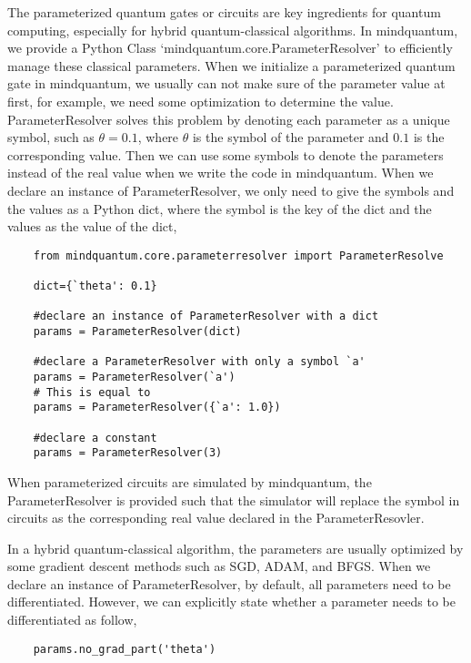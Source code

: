 


The parameterized quantum gates or circuits are key ingredients for quantum computing, especially for hybrid quantum-classical algorithms.
In mindquantum, we provide a Python Class `mindquantum.core.ParameterResolver' to efficiently manage these classical parameters.
When we initialize a parameterized quantum gate in mindquantum, we usually can not make sure of the parameter value at first, for example, we need some optimization to determine the value.
ParameterResolver solves this problem by
denoting each parameter as a unique symbol, such as $\theta=0.1$, where $\theta$ is the symbol of the parameter and $0.1$ is the corresponding value.
Then we can use some symbols to denote the parameters instead of the real value when we write the code in mindquantum. 
When we declare an instance of ParameterResolver, we only need to give the symbols and the values as a Python dict, where the symbol is the key of the dict and the values as the value of the dict,
\begin{lstlisting}
    from mindquantum.core.parameterresolver import ParameterResolve
    
    dict={`theta': 0.1}
    
    #declare an instance of ParameterResolver with a dict
    params = ParameterResolver(dict)

    #declare a ParameterResolver with only a symbol `a'
    params = ParameterResolver(`a')
    # This is equal to 
    params = ParameterResolver({`a': 1.0})

    #declare a constant
    params = ParameterResolver(3)
\end{lstlisting}
When parameterized circuits are simulated by mindquantum, the ParameterResolver is provided such that the simulator will replace the symbol in circuits as the corresponding real value declared in the ParameterResovler.

In a hybrid quantum-classical algorithm, the parameters are usually optimized by some gradient descent methods such as SGD, ADAM, and BFGS. 
When we declare an instance of ParameterResolver, by default, all parameters need to be differentiated.
However, we can explicitly state whether a parameter needs to be differentiated as follow,
\begin{lstlisting}
    params.no_grad_part('theta')
\end{lstlisting}

